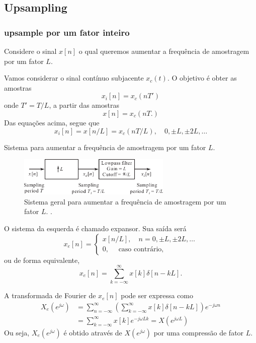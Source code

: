 \subsection{Upsampling}
\begin{frame}[allowframebreaks]
  \frametitle{upsample por um fator inteiro}

  Considere o sinal $x[n]$ o qual queremos aumentar a frequência de amostragem por um fator $L$.

  Vamos considerar o sinal contínuo subjacente $x_c(t)$. O objetivo é obter as amostras
  \begin{equation}
   x_i[n] = x_c(nT')
  \end{equation}
  onde $T'=T/L$, a partir das amostras
  \begin{equation}
   x[n] = x_c(nT .)
  \end{equation}
  Das equações acima, segue que
  \begin{equation}
   x_i[n] = x[n/L] = x_c(nT/L), \quad 0, \pm L, \pm 2 L, \ldots
  \end{equation}

  \framebreak
  Sistema para aumentar a frequência de amostragem por um fator $L$.
        \begin{figure}[h!]
        \centering
        \includegraphics[width=0.65\textwidth]{images/fig423.pdf}
        \caption{Sistema geral para aumentar a frequência de amostragem por um fator $L$. \citep{oppenheim2009}.}
        \label{fig:fig423}
        \end{figure}

  O sistema da esquerda é chamado expansor. Sua saída será
  \begin{equation}
   x_e[n] = \begin{cases} 
      x[n/L] , \quad n = 0, \pm L, \pm 2L, \ldots \\
      0 , \quad \text{ caso contrário,}
            \end{cases}
  \end{equation}
  ou de forma equivalente,
  \begin{equation}
   x_e[n] = \sum_{k=-\infty}^{\infty} x[k] \delta[n-kL] .
  \end{equation}

  A transformada de Fourier de $x_e[n]$ pode ser expressa como
  \begin{align}
   X_e(e^{j\omega}) &= \sum_{n=-\infty}^{\infty} \left( \sum_{k=-\infty}^{\infty} x[k] \delta[n-kL]  \right) e^{-j\omega n} \\
                    &= \sum_{k=-\infty}^{\infty} x[k] e^{-j\omega L k} = X(e^{j\omega L})
  \end{align}
  Ou seja, $X_e(e^{j\omega})$ é obtido através de $X(e^{j\omega})$ por uma compressão de fator $L$.


\end{frame}
